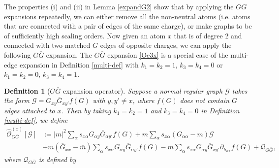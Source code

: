\documentclass{article}
\newcommand{\1}{\mathds{1}}
\numberwithin{equation}{section}
\newcommand{\al}{\alpha}
\renewcommand{\cal}{\mathcal}
\newcommand{\wh}{\widehat}
\theoremstyle{plain} %
\newtheorem{definition}[theorem]{Definition}
\theoremstyle{remark}
\newcommand{\cor}{\color{red}}
\newcommand{\hty}[1]{{\cor (ht: #1) }}
\begin{document}
The properties (i) and (ii) in Lemma \ref{expandG2} show that by applying the $GG$ expansions repeatedly, we can either remove all the non-neutral atoms (i.e. atoms that are connected with a pair of edges of the same charge), or make graphs to be of sufficiently high scaling orders. 
Now given an atom $x$ that is of degree 2 and connected with two matched $G$ edges of opposite charges, we can apply the following $G\overline G$ expansion. The $G\overline G$ expansion \eqref{Oe3x} is a special case of the multi-edge expansion in Definition \ref{multi-def} with $k_1=k_2=1$, $k_3=k_4=0$ or $k_1=k_2=0$, $k_3=k_4=1$. 

\fi 

\begin{definition} [$G\overline G$ expansion operator]\label{GGbar-def} 
	Suppose a normal regular graph $\cal G$ takes the form $\cal G= G_{xy}  \overline G_{xy'} f(G)$ with $y,y' \ne x$, where $f (G) $ does not contain $G$ edges attached to $x$.
	Then by taking $k_1=k_2=1$ and $k_3=k_4=0$ in Definition \ref{multi-def}, we define  
	\begin{align}
		\wh{\cal O}_{G\overline G}^{(x)}[\cal G] &:=   |m|^2  \sum_\al s_{x\al }G_{\al y} \overline G_{\al y'} f(G) + m \sum_\al s_{x\al }\left(G_{\al \al} -m \right) \cal G \nonumber  \\
		&  +  m (\overline G_{xx} - \overline m)   \sum_\al s_{x\al }G_{\al y} \overline G_{\al y'} f(G)  - m  \sum_\al s_{x\al }G_{\al y}  \overline G_{xy'} \partial_{ h_{\al x}} f(G) + \cal Q_{G\overline G},\label{Oe3x}
	\end{align}
	where $\cal Q_{G\overline G} $ is defined by
	\begin{align*}

\end{align*}
\end{definition}
\end{document}

